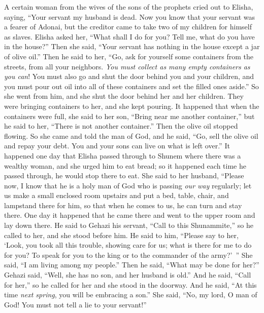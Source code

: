 \begin{biblechapter} %
 A certain woman from the wives of the sons of the prophets cried out to Elisha, saying, “Your servant my husband is dead. Now you know that your servant was a fearer of Adonai, but the creditor came to take two of my children for himself as slaves.
\verse Elisha asked her, “What shall I do for you? Tell me, what do you have in the house?” Then she said, “Your servant has nothing in the house except a jar of olive oil.”
\verse Then he said to her, “Go, ask for yourself some containers from the streets, from all your neighbors. \textit{You must collect as many empty containers as you can}!
\verse You must also go and shut the door behind you and your children, and you must pour out oil into all of these containers and set the filled ones aside.”
\verse So she went from him, and she shut the door behind her and her children. They were bringing containers to her, and she kept pouring.
\verse It happened that when the containers were full, she said to her son, “Bring near me another container,” but he said to her, “There is not another container.” Then the olive oil stopped flowing.
\verse So she came and told the man of God, and he said, “Go, sell the olive oil and repay your debt. You and your sons can live on what is left over.”
 It happened one day that Elisha passed through to Shunem where there was a wealthy woman, and she urged him to eat bread; so it happened each time he passed through, he would stop there to eat.
\verse She said to her husband, “Please now, I know that he is a holy man of God who is passing \textit{our way} regularly;
\verse let us make a small enclosed room upstairs and put a bed, table, chair, and lampstand there for him, so that when he comes to us, he can turn and stay there.
\verse One day it happened that he came there and went to the upper room and lay down there.
\verse He said to Gehazi his servant, “Call to this Shunammite,” so he called to her, and she stood before him.
\verse He said to him, “Please say to her, ‘Look, you took all this trouble, showing care for us; what is there for me to do for you? To speak for you to the king or to the commander of the army?’ ” She said, “I am living among my people.”
\verse Then he said, “What may be done for her?” Gehazi said, “Well, she has no son, and her husband is old.”
\verse And he said, “Call for her,” so he called for her and she stood in the doorway.
\verse And he said, “At this time \textit{next spring}, you will be embracing a son.” She said, “No, my lord, O man of God! You must not tell a lie to your servant!”

\end{biblechapter}
